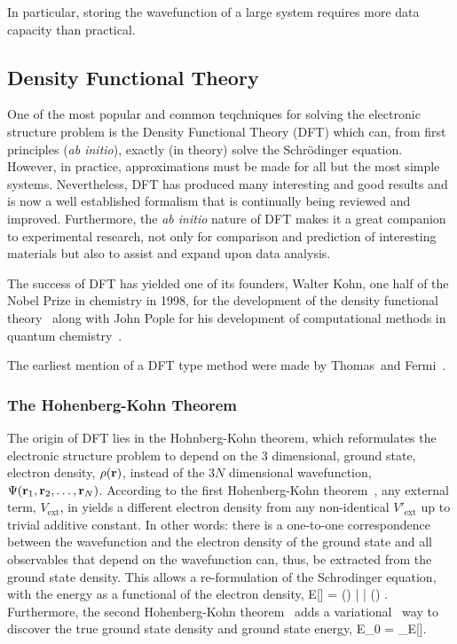 \bit
\item In particular, storing the wavefunction of a large system requires more data capacity than practical.
\eit

\subsection{Density Functional Theory}
\label{sec:methods-dft}
One of the most popular and common teqchniques for solving the electronic structure problem is the Density Functional Theory (DFT) which can, from first principles (\textit{ab initio}), exactly (in theory) solve the Schr\"odinger equation.
However, in practice, approximations must be made for all but the most simple systems.
Nevertheless, DFT has produced many interesting and good results and is now a well established formalism that is continually being reviewed and improved.
Furthermore, the \textit{ab initio} nature of DFT makes it a great companion to experimental research, not only for comparison and prediction of interesting materials but also to assist and expand upon data analysis.

The success of DFT has yielded one of its founders, Walter Kohn, one half of the Nobel Prize in chemistry in 1998, for the development of the density functional theory~\cite{kohn1999} along with John Pople for his development of computational methods in quantum chemistry~\cite{pople1999}.

\bit
\item The earliest mention of a DFT type method were made by Thomas~\citemiss and Fermi~\citemiss.
\eit

\subsubsection{The Hohenberg-Kohn Theorem}
The origin  of DFT lies in the Hohnberg-Kohn theorem, which reformulates the electronic structure problem to depend on the $3$ dimensional, ground state, electron density, $\rho({\mathrm{\mathbf{\bm{r}}}})$, instead of the $3N$ dimensional wavefunction, $\Psi({\mathrm{\mathbf{\bm{r}}}}_1, {\mathrm{\mathbf{\bm{r}}}}_2, \ldots, {\mathrm{\mathbf{\bm{r}}}}_N)$.
According to the first Hohenberg-Kohn theorem~\cite{hohenberg-kohn-1964}, any external term, $V_\text{ext}$, in  yields a different electron density from any non-identical $V'_\text{ext}$ up to trivial additive constant.
In other words: there is a one-to-one correspondence between the wavefunction and the electron density of the ground state and all observables that depend on the wavefunction can, thus, be extracted from the ground state density.
This allows a re-formulation of the Schrodinger equation, with the energy as a functional of the electron density, 
E[\rho] = \bra \Psi(\rho) |  | \Psi(\rho) \ket.
\eeq
Furthermore, the second Hohenberg-Kohn theorem~\cite{hohenberg-kohn-1964} adds a variational~\cite{variational-rayleigh-1870, variational-ritz-1909} way to discover the true ground state density and ground state energy,
E_0 = \min_\rho E[\rho].
\eeq

